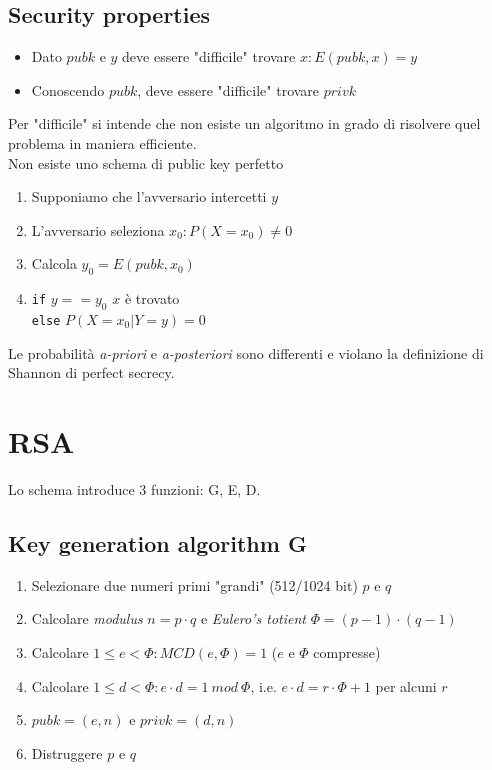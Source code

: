 \documentclass[a4paper,12pt]{article}
\begin{document}
\subsection{Security properties}
\begin{itemize}
	\item Dato $pubk$ e $y$ deve essere "difficile" trovare $x : E(pubk, x) = y$
	\item Conoscendo $pubk$, deve essere "difficile" trovare $privk$
\end{itemize}
Per "difficile" si intende che non esiste un algoritmo in grado di risolvere quel problema in maniera efficiente. \\
Non esiste uno schema di public key perfetto
\begin{enumerate}
	\item Supponiamo che l'avversario intercetti $y$
	\item L'avversario seleziona $x_0 : P(X = x_0) \neq 0$
	\item Calcola $y_0 = E(pubk, x_0)$
	\item \texttt{if} $y == y_0$ $x$ è trovato \\ \texttt{else} $P(X=x_0|Y=y) = 0$
\end{enumerate}
Le probabilità \textit{a-priori} e \textit{a-posteriori} sono differenti e violano la definizione di Shannon di perfect secrecy.

\section{RSA}
Lo schema introduce 3 funzioni: G, E, D.
\subsection{Key generation algorithm G}
\begin{enumerate}
	\item Selezionare due numeri primi "grandi" (512/1024 bit) $p$ e $q$
	\item Calcolare \textit{modulus} $n = p \cdot q$ e \textit{Eulero's totient} $\Phi = (p-1)\cdot(q-1)$
	\item Calcolare $1 \leq e < \Phi : MCD(e, \Phi) = 1$ ($e$ e $\Phi$ compresse)
	\item Calcolare $1 \leq d < \Phi : e\cdot d = 1\ mod\ \Phi$, i.e. $e\cdot d = r\cdot\Phi + 1$ per alcuni $r$
	\item $pubk = (e,n)$ e $privk = (d,n)$
	\item Distruggere $p$ e $q$
\end{enumerate}
\end{document}
